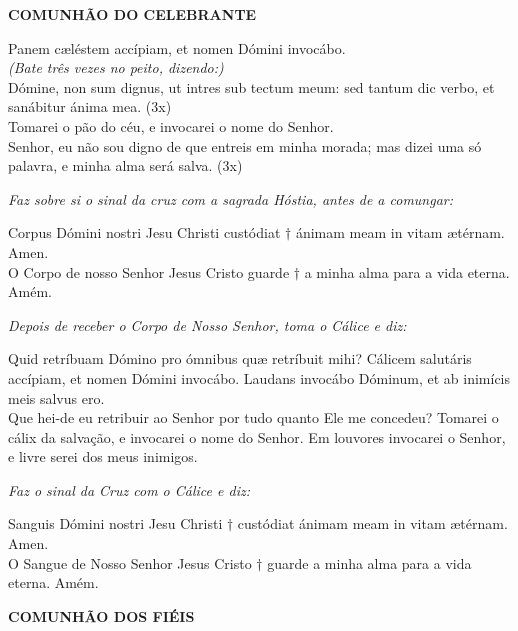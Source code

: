 \begin{center}
	\textbf{COMUNHÃO DO CELEBRANTE}
\end{center}
\begin{multicols}{2}
	\noindent Panem cæléstem accípiam, et nomen Dómini invocábo.
	\\ \textit{(Bate três vezes no peito, dizendo:)}
	\\ Dómine, non sum dignus, ut intres sub tectum meum: sed tantum dic verbo, et sanábitur ánima mea. (3x)  
	\\Tomarei o pão do céu, e invocarei o nome do Senhor.
	\\ Senhor, eu não sou digno de que entreis em minha morada; mas dizei uma só palavra, e minha alma será salva. (3x)
\end{multicols}
\begin{flushleft}
	\textit{Faz sobre si o sinal da cruz com a sagrada Hóstia, antes de a comungar:}
\end{flushleft}
\begin{multicols}{2}
	\noindent Corpus Dómini nostri Jesu Christi custódiat $ \dag$ ánimam meam in vitam ætérnam. Amen. 
	\\O Corpo de nosso Senhor Jesus Cristo guarde $ \dag$ a minha alma para a vida eterna. Amém. 
\end{multicols}
\begin{flushleft}
	\textit{Depois de receber o Corpo de Nosso Senhor, toma o Cálice e diz:}
\end{flushleft}
\begin{multicols}{2}
	\noindent Quid retríbuam Dómino pro ómnibus quæ retríbuit mihi? Cálicem salutáris accípiam, et nomen Dómini invocábo. Laudans invocábo Dóminum, et ab inimícis meis salvus ero. 
	\\ Que hei-de eu retribuir ao Senhor por tudo quanto Ele me concedeu? Tomarei o cálix da salvação, e invocarei o nome do Senhor. Em louvores invocarei o Senhor, e livre serei dos meus inimigos.	
\end{multicols}
\begin{flushleft}
	\textit{
		Faz o sinal da Cruz com o Cálice e diz:}
\end{flushleft}
\begin{multicols}{2}
	\noindent Sanguis Dómini nostri Jesu Christi $ \dag$ custódiat ánimam meam in vitam ætérnam. Amen. 
	\\ O Sangue de Nosso Senhor Jesus Cristo $ \dag$ guarde a minha alma para a vida eterna. Amém.	
\end{multicols}
\begin{center}
	\textbf{COMUNHÃO DOS FIÉIS}
\end{center}
